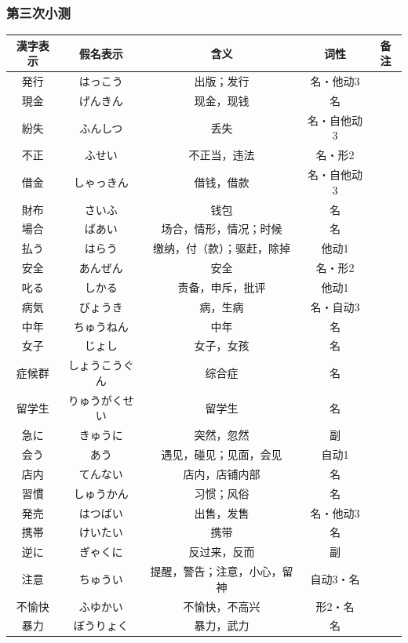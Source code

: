 \subsubsection{第三次小测}
\begin{longtable}{|c|c|c|c|c|}
    \hline
漢字表示 & 假名表示  & 含义 & 词性 & 备注 \\ \hline\hline
発行 & はっこう & 出版；发行 & 名・他动3 &  \\ \hline
現金 & げんきん & 现金，现钱 & 名 &  \\ \hline
紛失 & ふんしつ & 丢失 & 名・自他动3 &  \\ \hline
不正 & ふせい & 不正当，违法 & 名・形2 &  \\ \hline
借金 & しゃっきん & 借钱，借款 & 名・自他动3 &  \\ \hline
財布 & さいふ & 钱包 & 名 &  \\ \hline
場合 & ばあい & 场合，情形，情况；时候 & 名 &  \\ \hline
払う & はらう & 缴纳，付（款）；驱赶，除掉 & 他动1 &  \\ \hline
安全 & あんぜん & 安全 & 名・形2 &  \\ \hline
叱る & しかる & 责备，申斥，批评 & 他动1 &  \\ \hline
病気 & びょうき & 病，生病 & 名・自动3 &  \\ \hline
中年 & ちゅうねん & 中年 & 名 &  \\ \hline
女子 & じょし & 女子，女孩 & 名 &  \\ \hline
症候群 & しょうこうぐん & 综合症 & 名 &  \\ \hline
留学生 & りゅうがくせい & 留学生 & 名 &  \\ \hline
急に & きゅうに & 突然，忽然 & 副 &  \\ \hline
会う & あう & 遇见，碰见；见面，会见 & 自动1 &  \\ \hline
店内 & てんない & 店内，店铺内部 & 名 &  \\ \hline
習慣 & しゅうかん & 习惯；风俗 & 名 &  \\ \hline
発売 & はつばい & 出售，发售 & 名・他动3 &  \\ \hline
携帯 & けいたい & 携带　& 名 &  \\ \hline
逆に & ぎゃくに & 反过来，反而 & 副 &  \\ \hline
注意 & ちゅうい & 提醒，警告；注意，小心，留神 & 自动3・名 &  \\ \hline
不愉快 & ふゆかい & 不愉快，不高兴 & 形2・名 &  \\ \hline
暴力 & ぼうりょく & 暴力，武力 & 名 &  \\ \hline

\end{longtable}
